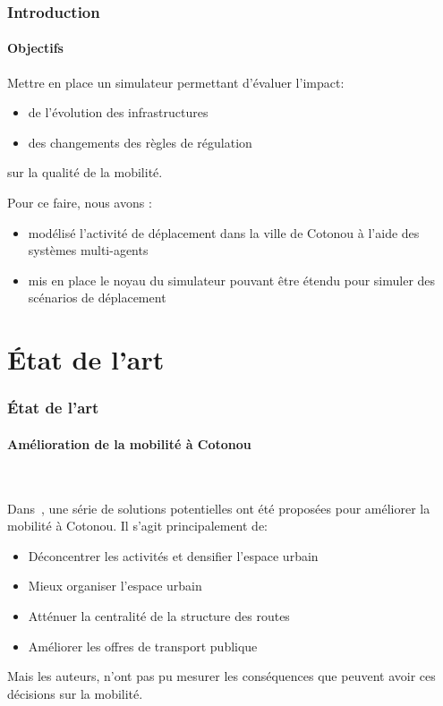 \begin{frame}
    \frametitle{Introduction}
    \framesubtitle{Objectifs}
    Mettre en place un simulateur permettant d'évaluer l'impact:
    \begin{itemize}
        \item de l'évolution des infrastructures
        \item des changements des règles de régulation
    \end{itemize}
    \pause{}%
    sur la qualité de la mobilité.

    Pour ce faire, nous avons :
    \begin{itemize}
        \item modélisé l'activité de déplacement dans la ville de Cotonou à l'aide des systèmes multi-agents
        \item mis en place le noyau du simulateur pouvant être étendu pour simuler des scénarios de déplacement
    \end{itemize}
\end{frame}


\section{État de l'art}\label{sec:etat_art}
\begin{frame}
    \frametitle{État de l'art}
    \framesubtitle{Amélioration de la mobilité à Cotonou}

    \begin{block}{~\autocite{adonon_problematique}}

        Dans~\autocite{adonon_problematique}, une série de solutions potentielles ont été proposées pour améliorer la mobilité à Cotonou.
        Il s'agit principalement de:

        \begin{itemize}
            \item Déconcentrer les activités et densifier l'espace urbain
            \item Mieux organiser l'espace urbain
            \item Atténuer la centralité de la structure des routes
            \item Améliorer les offres de transport publique
        \end{itemize}

    \end{block}
    \pause{}
    Mais les auteurs, n'ont pas pu mesurer les conséquences que peuvent avoir ces décisions sur la mobilité.
\end{frame}

